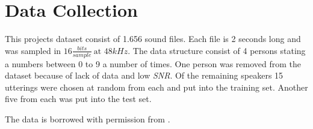 \section*{Data Collection}

This projects dataset consist of 1.656 sound files. 
Each file is 2 seconds long and was sampled in $16 \frac{bits}{sample} \ \text{at } 48 kHz $.
The data structure consist of 4 persons stating a numbers between 0 to 9 a number of times. 
One person was removed from the dataset because of lack of data and low \emph{SNR}.
Of the remaining speakers 15 utterings were chosen at random from each and put into the training set.
Another five from each was put into the test set.

The data is borrowed with permission from \cite{DataSet}. 